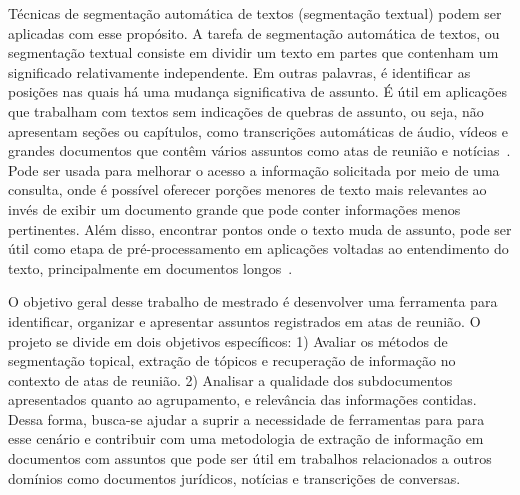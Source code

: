 

Técnicas de segmentação automática de textos (segmentação textual) podem ser aplicadas com esse propósito. A tarefa de segmentação automática de textos, ou segmentação textual consiste em dividir um texto em partes que contenham um significado relativamente independente. Em outras palavras, é identificar as posições nas quais há uma mudança significativa de assunto. É útil em aplicações que trabalham com textos sem indicações de quebras de assunto, ou seja, não apresentam seções ou capítulos, como transcrições automáticas de áudio, vídeos e grandes documentos que contêm vários assuntos como atas de reunião e notícias~\cite{ Bokaei2015, Sakahara2014, Misra2009, Eisenstein2008, Choi2000}.
Pode ser usada para melhorar o acesso a informação solicitada por meio de uma consulta, onde é possível oferecer porções menores de texto mais relevantes ao invés de exibir um documento grande que pode conter informações menos pertinentes.  Além disso, encontrar pontos onde o texto muda de assunto, pode ser útil como etapa de pré-processamento em aplicações voltadas ao entendimento do texto, principalmente em documentos longos~\cite{Choi2000}.








O objetivo geral desse trabalho de mestrado é desenvolver uma ferramenta para identificar, organizar e apresentar assuntos registrados em atas de reunião. O projeto se divide em dois objetivos específicos: 1) Avaliar os métodos de segmentação topical, extração de tópicos e recuperação de informação no contexto de atas de reunião. 2) Analisar a qualidade dos subdocumentos apresentados quanto ao agrupamento, e relevância das informações contidas.
Dessa forma, busca-se ajudar a suprir a necessidade de ferramentas para para esse cenário e contribuir com uma metodologia de extração de informação em documentos com assuntos que pode ser útil em trabalhos relacionados a outros domínios como documentos jurídicos, notícias e transcrições de conversas.











